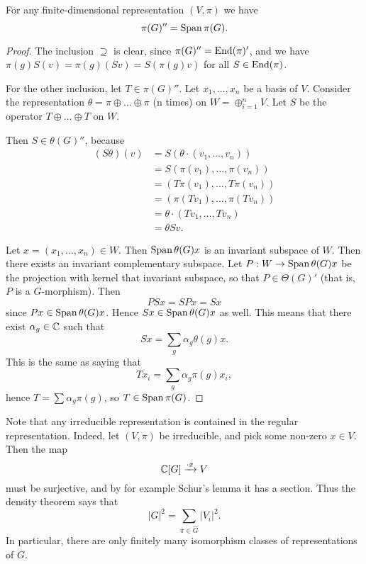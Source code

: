 \documentclass[11pt, english]{article}
\begin{document}
\begin{thm}
\label{seconddensity}
 For any finite-dimensional representation $(V,\pi)$ we have 
\[
\pi(G)'' = \operatorname{Span}{\pi(G)}.
\]
\end{thm}
\begin{proof}
The inclusion $\supseteq$ is clear, since $\pi(G)''=\operatorname{End}(\pi)'$, and we have $\pi(g) S(v) = \pi(g) (Sv) = S (\pi(g)v)$ for all $S \in \operatorname{End}(\pi)$.

For the other inclusion, let $T \in \pi(G)''$. Let $x_1,\ldots,x_n$ be a basis of $V$. Consider the representation $\theta = \pi \oplus \ldots \oplus \pi$ (n times) on $W = \oplus_{i=1}^n V$. Let $S$ be the operator $T \oplus \ldots \oplus T$ on $W$. 

Then $S \in \theta(G)''$, because 
\begin{align*}
  (S\theta )(v) &= S( \theta \cdot (v_1,\ldots,v_n)) \\
&= S( \pi(v_1),\ldots, \pi(v_n)) \\
&= (T\pi(v_1),\ldots, T\pi(v_n)) \\
&= (\pi(Tv_1), \ldots, \pi(Tv_n)) \\
&= \theta \cdot ( Tv_1,\ldots, Tv_n) \\
&= \theta  Sv.
\end{align*}

Let $x=(x_1,\ldots,x_n) \in W$. Then $\operatorname{Span}{\theta (G) x }$ is an invariant subspace of $W$. Then there exists an invariant complementary subspace. Let $P:W \to \operatorname{Span}{\theta(G)x}$ be the projection with kernel that invariant subspace, so that $P \in \Theta(G)'$ (that is, $P$ is a $G$-morphism). Then
$$
PSx = SPx = Sx
$$
since $P x \in \operatorname{Span}{\theta(G)x}$. Hence $Sx \in \operatorname{Span} { \theta(G)x }$ as well. This means that there exist $\alpha_g \in \mathbb{C}$ such that
$$
Sx = \sum_g \alpha_g \theta(g)x.
$$
This is the same as saying that
$$
Tx_i = \sum_g \alpha_g \pi(g)x_i,
$$
hence $T = \sum \alpha_g \pi(g)$, so $T \in \operatorname{Span} \pi(G)$.
\end{proof}

\begin{remark}
Note that any irreducible representation is contained in the regular representation. Indeed, let $(V,\pi)$ be irreducible, and pick some non-zero $x \in V$. Then the map
$$
\mathbb{C}[G] \xrightarrow{\cdot x} V
$$
must be surjective, and by for example Schur's lemma it has a section. Thus the density theorem says that 
$$
\lvert G \rvert ^2  = \sum_{\overline{\pi} \in \widehat G} \lvert V_i \rvert^2.
$$
In particular, there are only finitely many isomorphism classes of representations of $G$.
\end{remark}
\end{document}
